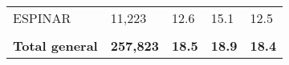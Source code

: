 \begin{tabular}{lllll}
	\cellcolor[HTML]{FF5050}ESPINAR                                & 11,223                                                                & 12.6                                                                             & 15.1                                                                        & 12.5                                                                                \\
	&                                                                       &                                                                                  &                                                                             &                                                                                     \\
	\rowcolor[HTML]{DDEBF7} 
	\textbf{Total   general}                                       & \textbf{257,823}                                                      & \textbf{18.5}                                                                    & \textbf{18.9}                                                               & \textbf{18.4}                                                                      
\end{tabular}